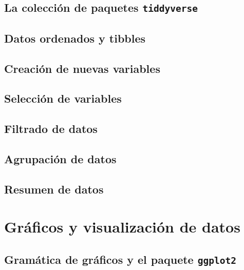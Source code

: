 \documentclass[
]{book}
\theoremstyle{definition}
\theoremstyle{definition}
\theoremstyle{definition}
\theoremstyle{definition}
\theoremstyle{remark}
\begin{document}
\hypertarget{la-colecciuxf3n-de-paquetes-tiddyverse}{%
\section{\texorpdfstring{La colección de paquetes \texttt{tiddyverse}}{La colección de paquetes tiddyverse}}\label{la-colecciuxf3n-de-paquetes-tiddyverse}}

\hypertarget{datos-ordenados-y-tibbles}{%
\section{Datos ordenados y tibbles}\label{datos-ordenados-y-tibbles}}

\hypertarget{creaciuxf3n-de-nuevas-variables}{%
\section{Creación de nuevas variables}\label{creaciuxf3n-de-nuevas-variables}}

\hypertarget{selecciuxf3n-de-variables}{%
\section{Selección de variables}\label{selecciuxf3n-de-variables}}

\hypertarget{filtrado-de-datos}{%
\section{Filtrado de datos}\label{filtrado-de-datos}}

\hypertarget{agrupaciuxf3n-de-datos}{%
\section{Agrupación de datos}\label{agrupaciuxf3n-de-datos}}

\hypertarget{resumen-de-datos}{%
\section{Resumen de datos}\label{resumen-de-datos}}

\hypertarget{gruxe1ficos-y-visualizaciuxf3n-de-datos}{%
\chapter{Gráficos y visualización de datos}\label{gruxe1ficos-y-visualizaciuxf3n-de-datos}}

\hypertarget{gramuxe1tica-de-gruxe1ficos-y-el-paquete-ggplot2}{%
\section{\texorpdfstring{Gramática de gráficos y el paquete \texttt{ggplot2}}{Gramática de gráficos y el paquete ggplot2}}\label{gramuxe1tica-de-gruxe1ficos-y-el-paquete-ggplot2}}
\end{document}
